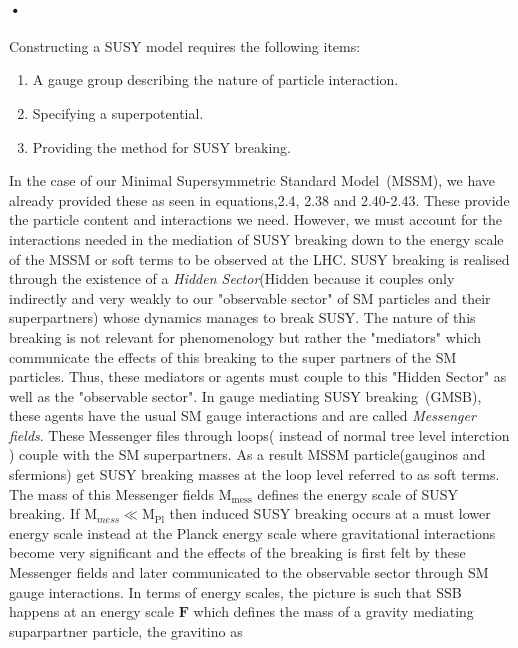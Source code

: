 {\paragraph*{•}
Constructing a SUSY model requires the following items:
\begin{enumerate}
\item  A gauge group describing the nature of particle interaction.
\item Specifying a superpotential. 
\item Providing the method for SUSY breaking.
\end{enumerate}
In the case of our Minimal Supersymmetric Standard Model~(MSSM), we have already provided these as seen in equations,2.4, 2.38 and 2.40-2.43.
These provide the particle content and interactions we need. However,  we must account for the interactions needed in the mediation of SUSY breaking down to the energy scale of the MSSM or soft terms to be observed at the LHC.
\newline
SUSY breaking is realised through the existence of a \textit{Hidden Sector}(Hidden because it couples only indirectly and very weakly to our "observable sector" of SM particles and their superpartners) whose dynamics manages to break SUSY. The nature of this breaking is not relevant for phenomenology but rather the "mediators" which communicate the effects of this breaking to the super partners of the SM particles. Thus, these mediators or agents must couple to this "Hidden Sector" as well as the "observable sector".
In gauge mediating SUSY breaking~(GMSB), these agents have the usual SM gauge interactions  and are called \textit{Messenger fields}. These Messenger files through loops( instead of normal tree level interction ) couple with the SM superpartners. As a result MSSM particle(gauginos and sfermions) get SUSY breaking masses at the loop level referred to as soft terms. The mass of this Messenger fields $\displaystyle{\mathrm{M}_{\mbox{mess}}}$ defines the energy scale of SUSY breaking. If $\displaystyle{\mathrm{M}_{mess} \ll \mathrm{M}_{\mbox{Pl}}}$ then induced SUSY breaking occurs at a must lower energy scale instead at the Planck energy scale where gravitational interactions become very significant and the effects of the breaking is first felt by these Messenger fields and later communicated to the observable sector through SM gauge interactions.
In terms of energy scales, the picture is such that SSB happens at an energy scale $\mathbf{F}$ which defines the mass of a gravity mediating suparpartner particle, the gravitino as 
\begin{equation}

\end{equation}}

